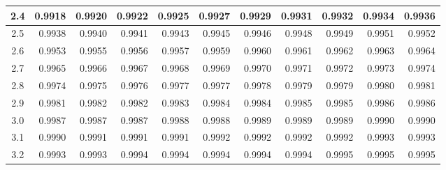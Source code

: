 \begin{table}[p]
\begin{center}
{\begin{tabular}{c | rrrrr | rrrrr |}
  2.4 & \footnotesize{0.9918} & \footnotesize{0.9920} & \footnotesize{0.9922} & \footnotesize{0.9925} & \footnotesize{0.9927} & \footnotesize{0.9929} & \footnotesize{0.9931} & \footnotesize{0.9932} & \footnotesize{0.9934} & \footnotesize{0.9936} \\
  \hline
  2.5 & \footnotesize{0.9938} & \footnotesize{0.9940} & \footnotesize{0.9941} & \footnotesize{0.9943} & \footnotesize{0.9945} & \footnotesize{0.9946} & \footnotesize{0.9948} & \footnotesize{0.9949} & \footnotesize{0.9951} & \footnotesize{0.9952} \\
  2.6 & \footnotesize{0.9953} & \footnotesize{0.9955} & \footnotesize{0.9956} & \footnotesize{0.9957} & \footnotesize{0.9959} & \footnotesize{0.9960} & \footnotesize{0.9961} & \footnotesize{0.9962} & \footnotesize{0.9963} & \footnotesize{0.9964} \\
  2.7 & \footnotesize{0.9965} & \footnotesize{0.9966} & \footnotesize{0.9967} & \footnotesize{0.9968} & \footnotesize{0.9969} & \footnotesize{0.9970} & \footnotesize{0.9971} & \footnotesize{0.9972} & \footnotesize{0.9973} & \footnotesize{0.9974} \\
  2.8 & \footnotesize{0.9974} & \footnotesize{0.9975} & \footnotesize{0.9976} & \footnotesize{0.9977} & \footnotesize{0.9977} & \footnotesize{0.9978} & \footnotesize{0.9979} & \footnotesize{0.9979} & \footnotesize{0.9980} & \footnotesize{0.9981} \\
  2.9 & \footnotesize{0.9981} & \footnotesize{0.9982} & \footnotesize{0.9982} & \footnotesize{0.9983} & \footnotesize{0.9984} & \footnotesize{0.9984} & \footnotesize{0.9985} & \footnotesize{0.9985} & \footnotesize{0.9986} & \footnotesize{0.9986} \\
  \hline
  \hline
  3.0 & \footnotesize{0.9987} & \footnotesize{0.9987} & \footnotesize{0.9987} & \footnotesize{0.9988} & \footnotesize{0.9988} & \footnotesize{0.9989} & \footnotesize{0.9989} & \footnotesize{0.9989} & \footnotesize{0.9990} & \footnotesize{0.9990} \\
  3.1 & \footnotesize{0.9990} & \footnotesize{0.9991} & \footnotesize{0.9991} & \footnotesize{0.9991} & \footnotesize{0.9992} & \footnotesize{0.9992} & \footnotesize{0.9992} & \footnotesize{0.9992} & \footnotesize{0.9993} & \footnotesize{0.9993} \\
  3.2 & \footnotesize{0.9993} & \footnotesize{0.9993} & \footnotesize{0.9994} & \footnotesize{0.9994} & \footnotesize{0.9994} & \footnotesize{0.9994} & \footnotesize{0.9994} & \footnotesize{0.9995} & \footnotesize{0.9995} & \footnotesize{0.9995} \\

\end{tabular}}
\end{center}
\end{table}
